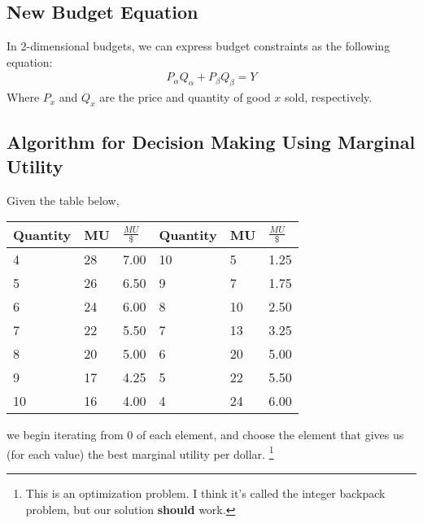                 \subsection{New Budget Equation} %
                \label{sub:new_budget_equation}
                    In 2-dimensional budgets, we can express budget constraints as the following equation:
                    \begin{align*}
                        P_\alpha Q_\alpha + P_\beta Q_\beta = Y
                    \end{align*}
                    Where $P_x$ and $Q_x$ are the price and quantity of good $x$ sold, respectively.
                \subsection{Algorithm for Decision Making Using Marginal Utility} %
                \label{sub:algorithm_for_decision_making_using_marginal_utility}
                    Given the table below,
                    \begin{table}[h]
                        \centering
                        \begin{tabular}{ | l | l | l || l | l | l | }
                        \hline
                        Quantity & MU & $\frac{MU}{\$}$ & Quantity & MU & $\frac{MU}{\$}$ \\ \hline \hline
                        4 & 28 & 7.00 & 10 & 5 & 1.25 \\ \hline
                        5 & 26 & 6.50 & 9 & 7 & 1.75 \\ \hline
                        6 & 24 & 6.00 & 8 & 10 & 2.50 \\ \hline
                        7 & 22 & 5.50 & 7 & 13 & 3.25 \\ \hline
                        8 & 20 & 5.00 & 6 & 20 & 5.00 \\ \hline
                        9 & 17 & 4.25 & 5 & 22 & 5.50 \\ \hline
                        10 & 16 & 4.00 & 4 & 24 & 6.00 \\ \hline
                        \end{tabular}
                    \end{table}
                    we begin iterating from 0 of each element, and choose the element that gives us (for each value) the best marginal utility per dollar.
                    \footnote{This is an optimization problem. I think it's called the integer backpack problem, but our solution \textbf{should} work.}
